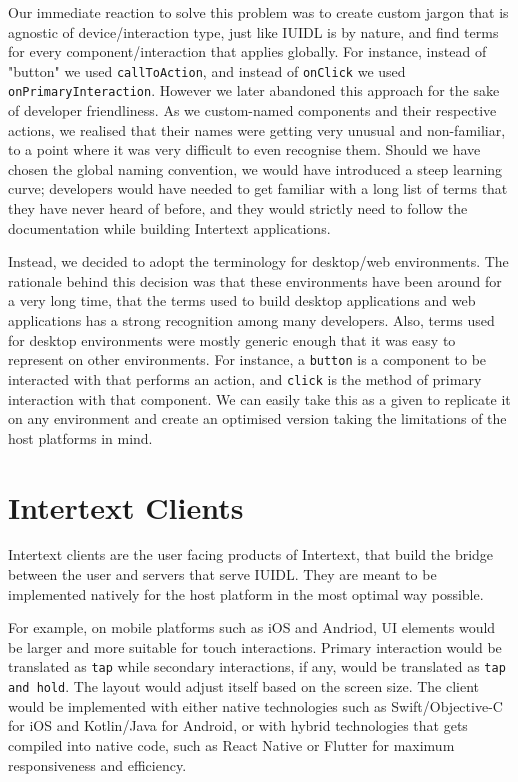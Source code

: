 Our immediate reaction to solve this problem was to create custom jargon that is agnostic of device/interaction type, just like IUIDL is by nature, and find terms for every component/interaction that applies globally. For instance, instead of "button" we used \texttt{callToAction}, and instead of \texttt{onClick} we used \texttt{onPrimaryInteraction}. However we later abandoned this approach for the sake of developer friendliness. As we custom-named components and their respective actions, we realised that their names were getting very unusual and non-familiar, to a point where it was very difficult to even recognise them. Should we have chosen the global naming convention, we would have introduced a steep learning curve; developers would have needed to get familiar with a long list of terms that they have never heard of before, and they would strictly need to follow the documentation while building Intertext applications.

Instead, we decided to adopt the terminology for desktop/web environments. The rationale behind this decision was that these environments have been around for a very long time, that the terms used to build desktop applications and web applications has a strong recognition among many developers. Also, terms used for desktop environments were mostly generic enough that it was easy to represent on other environments. For instance, a \texttt{button} is a component to be interacted with that performs an action, and \texttt{click} is the method of primary interaction with that component. We can easily take this as a given to replicate it on any environment and create an optimised version taking the limitations of the host platforms in mind.

\section{Intertext Clients} \label{intertextClients}

Intertext clients are the user facing products of Intertext, that build the bridge between the user and servers that serve IUIDL. They are meant to be implemented natively for the host platform in the most optimal way possible. 

For example, on mobile platforms such as iOS and Andriod, UI elements would be larger and more suitable for touch interactions. Primary interaction would be translated as \texttt{tap} while secondary interactions, if any, would be translated as \texttt{tap and hold}. The layout would adjust itself based on the screen size. The client would be implemented with either native technologies such as Swift/Objective-C for iOS and Kotlin/Java for Android, or with hybrid technologies that gets compiled into native code, such as React Native or Flutter for maximum responsiveness and efficiency. 


